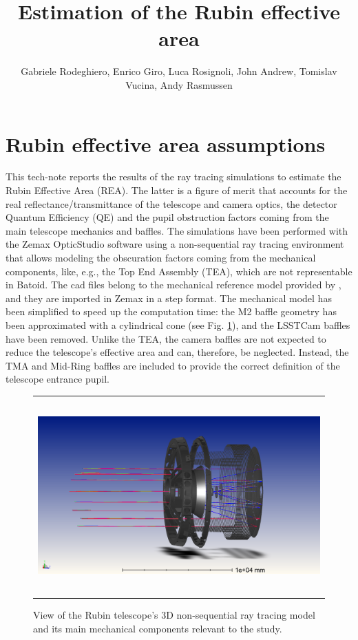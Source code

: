 \documentclass[SE,authoryear,toc]{lsstdoc}
\title{Estimation of the Rubin effective area}
\author{%
Gabriele Rodeghiero, Enrico Giro, Luca Rosignoli, John Andrew, Tomislav Vucina, Andy Rasmussen
}
\date{\vcsDate}
\begin{document}
\maketitle


\section{Rubin effective area assumptions} 

This tech-note reports the results of the ray tracing simulations to estimate the Rubin Effective Area (REA). The latter is a figure of merit that accounts for the real reflectance/transmittance of the telescope and camera optics, the detector Quantum Efficiency (QE) and the pupil obstruction factors coming from the main telescope mechanics and baffles.
The simulations have been performed with the Zemax OpticStudio software using a non-sequential ray tracing environment that allows modeling the obscuration factors coming from the mechanical components, like, e.g., the Top End Assembly (TEA), which are not representable in Batoid. The cad files belong to the mechanical reference model provided by \cite{JohnA}, and they are imported in Zemax in a step format. The mechanical model has been simplified to speed up the computation time: the M2 baffle geometry has been approximated with a cylindrical cone (see Fig. \ref{baffles}), and the LSSTCam baffles have been removed. Unlike the TEA, the camera baffles are not expected to reduce the telescope's effective area and can, therefore, be neglected. Instead, the TMA and Mid-Ring baffles are included to provide the correct definition of the telescope entrance pupil.


\begin{figure}
\begin{center}
\begin{tabular}{c}
\includegraphics[height=7.5cm]{Rubin_effective_area_baffles}
\end{tabular}
\end{center}
\caption 
{ \label{baffles} View of the Rubin telescope's 3D non-sequential ray tracing model and its main mechanical components relevant to the study.}
\end{figure} 
\end{document}
